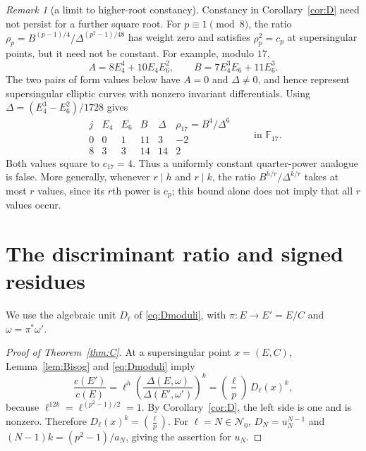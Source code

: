 \documentclass[11pt,a4paper]{article}
\numberwithin{equation}{section}
\theoremstyle{definition}
\theoremstyle{remark}
\newtheorem{remark}[theorem]{Remark}
\newcommand{\Lp}[1]{\left(\frac{#1}{p}\right)}
\begin{document}
\begin{remark}[a limit to higher-root constancy]\label{rem:higher-roots}
Constancy in Corollary~\ref{cor:D} need not persist for a further
square root. For $p\equiv1\pmod8$, the ratio
$\rho_p=B^{(p-1)/4}/\Delta^{(p^2-1)/48}$ has weight zero and satisfies
$\rho_p^2=c_p$ at supersingular points, but it need not be constant.
For example, modulo $17$,
\[
A=8E_4^4+10E_4E_6^2,\qquad B=7E_4^3E_6+11E_6^3.
\]
The two pairs of form values below have $A=0$ and $\Delta\ne0$, and
hence represent supersingular elliptic curves with nonzero
invariant differentials. Using $\Delta=(E_4^3-E_6^2)/1728$ gives
\[
\begin{array}{c|cc|cc|c}
j&E_4&E_6&B&\Delta&\rho_{17}=B^4/\Delta^6\\\hline
0&0&1&11&3&-2\\
8&3&3&14&14&2
\end{array}
\qquad\text{in }\mathbb F_{17}.
\]
Both values square to $c_{17}=4$. Thus a uniformly constant
quarter-power analogue is false. More generally, whenever
$r\mid h$ and $r\mid k$, the ratio $B^{h/r}/\Delta^{k/r}$ takes at
most $r$ values, since its $r$th power is $c_p$; this bound alone
does not imply that all $r$ values occur.
\end{remark}

\section{The discriminant ratio and signed residues}\label{sec:proof}
We use the algebraic unit $D_\ell$ of \eqref{eq:Dmoduli}, with
$\pi:E\to E'=E/C$ and $\omega=\pi^*\omega'$.

\begin{proof}[Proof of Theorem~\ref{thm:C}]
At a supersingular point $x=(E,C)$, Lemma~\ref{lem:Bisog} and
\eqref{eq:Dmoduli} imply
\[
\frac{c(E')}{c(E)}
=\ell^h\left(\frac{\Delta(E,\omega)}{\Delta(E',\omega')}\right)^k
=\Lp\ell\,D_\ell(x)^k,
\]
because $\ell^{12k}=\ell^{(p^2-1)/2}=1$.
By Corollary~\ref{cor:D}, the left side is one and is nonzero.
Therefore $D_\ell(x)^k=\Lp\ell$. For $\ell=N\in\mathcal N_0$,
$D_N=u_N^{N-1}$ and $(N-1)k=(p^2-1)/a_N$, giving the assertion for $u_N$.
\end{proof}
\end{document}
